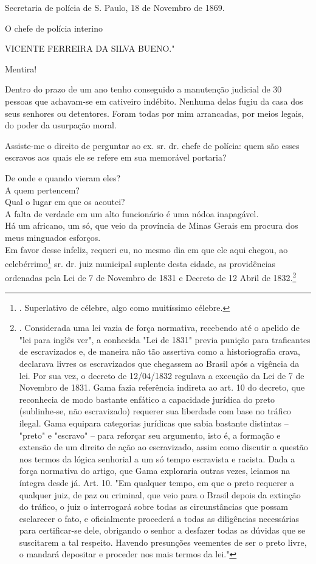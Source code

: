 Secretaria de polícia de S. Paulo, 18 de Novembro de 1869.

O chefe de polícia interino

VICENTE FERREIRA DA SILVA BUENO."

Mentira!

Dentro do prazo de um ano tenho conseguido a manutenção judicial de 30
pessoas que achavam-se em cativeiro indébito. Nenhuma delas fugiu da
casa dos seus senhores ou detentores. Foram todas por mim arrancadas,
por meios legais, do poder da usurpação moral.

Assiste-me o direito de perguntar ao ex. sr. dr. chefe de polícia: quem
são esses escravos aos quais ele se refere em sua memorável portaria?

De onde e quando vieram eles?\\
A quem pertencem?\\
Qual o lugar em que os acoutei?\\
A falta de verdade em um alto funcionário é uma nódoa inapagável.\\
Há um africano, um só, que veio da província de Minas Gerais em procura
dos meus minguados esforços.\\
Em favor desse infeliz, requeri eu, no mesmo dia em que ele aqui chegou,
ao celebérrimo\footnote{. Superlativo de célebre, algo como muitíssimo
  célebre.} sr. dr. juiz municipal suplente desta cidade, as
providências ordenadas pela Lei de 7 de Novembro de 1831 e Decreto de 12
Abril de 1832.\footnote{. Considerada uma lei vazia de força normativa,
  recebendo até o apelido de "lei para inglês ver", a conhecida "Lei de
  1831" previa punição para traficantes de escravizados e, de maneira
  não tão assertiva como a historiografia crava, declarava livres os
  escravizados que chegassem ao Brasil após a vigência da lei. Por sua
  vez, o decreto de 12/04/1832 regulava a execução da Lei de 7 de
  Novembro de 1831. Gama fazia referência indireta ao art. 10 do
  decreto, que reconhecia de modo bastante enfático a capacidade
  jurídica do preto (sublinhe-se, não escravizado) requerer sua
  liberdade com base no tráfico ilegal. Gama equipara categorias
  jurídicas que sabia bastante distintas -- "preto" e "escravo" -- para
  reforçar seu argumento, isto é, a formação e extensão de um direito de
  ação ao escravizado, assim como discutir a questão nos termos da
  lógica senhorial a um só tempo escravista e racista. Dada a força
  normativa do artigo, que Gama exploraria outras vezes, leiamos na
  íntegra desde já. Art. 10. "Em qualquer tempo, em que o preto requerer
  a qualquer juiz, de paz ou criminal, que veio para o Brasil depois da
  extinção do tráfico, o juiz o interrogará sobre todas as
  circunstâncias que possam esclarecer o fato, e oficialmente procederá
  a todas as diligências necessárias para certificar-se dele, obrigando
  o senhor a desfazer todas as dúvidas que se suscitarem a tal respeito.
  Havendo presunções veementes de ser o preto livre, o mandará depositar
  e proceder nos mais termos da lei."}

